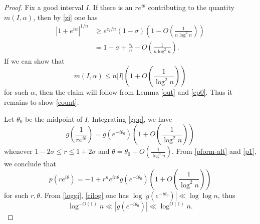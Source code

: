 \documentclass[12pt]{amsart}
\begin{document}
\begin{proof}
Fix a good interval $I$. If there is an $re^{i\theta}$ contributing to the quantity $m(I,\alpha)$, then by \eqref{zi} one has
\begin{align}
 |1 + e^{i\alpha}|^{1/n} &\geq e^{c_I/n} (1-\sigma) \left( 1 - O\left( \frac{1}{n \log^2 n} \right) \right) \nonumber\\
 &= 1 - \sigma + \frac{c_I}{n}- O\left( \frac{1}{n \log^2 n} \right).\label{wibble}
\end{align}
If we can show that
\begin{equation}\label{count}
     m(I,\alpha) \leq n|I| \left( 1 + O\left( \frac{1}{\log^2 n} \right) \right)
\end{equation}
for such $\alpha$, then the claim will follow from Lemma \ref{out} and \eqref{ep0}.  Thus it remains to show \eqref{count}.

Let $\theta_0$ be the midpoint of $I$.  Integrating \eqref{gpp}, we have
$$ g\left(\frac{1}{re^{i\theta}}\right) = g(e^{-i\theta_0}) \left( 1 + O\left(\frac{1}{\log^2 n} \right)\right)$$
whenever $1-2\sigma \leq r \leq 1+2\sigma$ and $\theta = \theta_0 + O(\frac{1}{\log^4 n})$.
From \eqref{pform-alt} and \eqref{p1}, we conclude that
\begin{equation}\label{pra}
 p(re^{i\theta}) = -1 + r^n e^{in\theta} g(e^{-i\theta_0}) \left( 1 + O\left(\frac{1}{\log^2 n} \right)\right)
\end{equation}
for such $r, \theta$.  From \eqref{loggi}, \eqref{cilog} one has $\log |g(e^{-i\theta_0})| \ll \log\log n$, thus
\begin{equation}\label{glog}
 \log^{-O(1)} n \ll |g(e^{-i\theta_0})| \ll \log^{O(1)} n.
\end{equation}


\end{proof}
\end{document}
